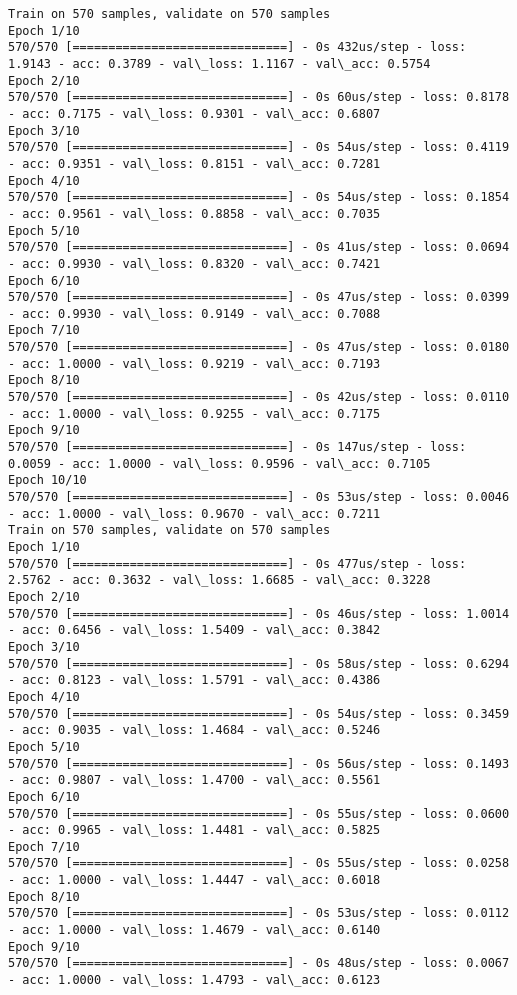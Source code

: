 \documentclass[11pt]{article}
\begin{document}
\begin{Verbatim}[commandchars=\\\{\}]
Train on 570 samples, validate on 570 samples
Epoch 1/10
570/570 [==============================] - 0s 432us/step - loss: 1.9143 - acc: 0.3789 - val\_loss: 1.1167 - val\_acc: 0.5754
Epoch 2/10
570/570 [==============================] - 0s 60us/step - loss: 0.8178 - acc: 0.7175 - val\_loss: 0.9301 - val\_acc: 0.6807
Epoch 3/10
570/570 [==============================] - 0s 54us/step - loss: 0.4119 - acc: 0.9351 - val\_loss: 0.8151 - val\_acc: 0.7281
Epoch 4/10
570/570 [==============================] - 0s 54us/step - loss: 0.1854 - acc: 0.9561 - val\_loss: 0.8858 - val\_acc: 0.7035
Epoch 5/10
570/570 [==============================] - 0s 41us/step - loss: 0.0694 - acc: 0.9930 - val\_loss: 0.8320 - val\_acc: 0.7421
Epoch 6/10
570/570 [==============================] - 0s 47us/step - loss: 0.0399 - acc: 0.9930 - val\_loss: 0.9149 - val\_acc: 0.7088
Epoch 7/10
570/570 [==============================] - 0s 47us/step - loss: 0.0180 - acc: 1.0000 - val\_loss: 0.9219 - val\_acc: 0.7193
Epoch 8/10
570/570 [==============================] - 0s 42us/step - loss: 0.0110 - acc: 1.0000 - val\_loss: 0.9255 - val\_acc: 0.7175
Epoch 9/10
570/570 [==============================] - 0s 147us/step - loss: 0.0059 - acc: 1.0000 - val\_loss: 0.9596 - val\_acc: 0.7105
Epoch 10/10
570/570 [==============================] - 0s 53us/step - loss: 0.0046 - acc: 1.0000 - val\_loss: 0.9670 - val\_acc: 0.7211
Train on 570 samples, validate on 570 samples
Epoch 1/10
570/570 [==============================] - 0s 477us/step - loss: 2.5762 - acc: 0.3632 - val\_loss: 1.6685 - val\_acc: 0.3228
Epoch 2/10
570/570 [==============================] - 0s 46us/step - loss: 1.0014 - acc: 0.6456 - val\_loss: 1.5409 - val\_acc: 0.3842
Epoch 3/10
570/570 [==============================] - 0s 58us/step - loss: 0.6294 - acc: 0.8123 - val\_loss: 1.5791 - val\_acc: 0.4386
Epoch 4/10
570/570 [==============================] - 0s 54us/step - loss: 0.3459 - acc: 0.9035 - val\_loss: 1.4684 - val\_acc: 0.5246
Epoch 5/10
570/570 [==============================] - 0s 56us/step - loss: 0.1493 - acc: 0.9807 - val\_loss: 1.4700 - val\_acc: 0.5561
Epoch 6/10
570/570 [==============================] - 0s 55us/step - loss: 0.0600 - acc: 0.9965 - val\_loss: 1.4481 - val\_acc: 0.5825
Epoch 7/10
570/570 [==============================] - 0s 55us/step - loss: 0.0258 - acc: 1.0000 - val\_loss: 1.4447 - val\_acc: 0.6018
Epoch 8/10
570/570 [==============================] - 0s 53us/step - loss: 0.0112 - acc: 1.0000 - val\_loss: 1.4679 - val\_acc: 0.6140
Epoch 9/10
570/570 [==============================] - 0s 48us/step - loss: 0.0067 - acc: 1.0000 - val\_loss: 1.4793 - val\_acc: 0.6123

\end{Verbatim}
\end{document}
